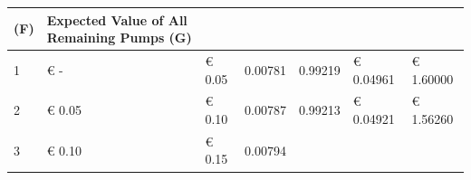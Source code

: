 \documentclass[serif, twocolumn, authordate, meta]{jote-article}
\begin{document}
\begin{table}[ht]
\begin{tabular}{@{}lllllll@{}}
\begin{minipage}[b]{0.12\linewidth}
\textbf{(F)}\strut \end{minipage} & \begin{minipage}[b]{0.12\linewidth}\raggedright \textbf{Expected Value of All Remaining Pumps (G)}\strut \end{minipage}\tabularnewline \hline \begin{minipage}[t]{0.12\linewidth}\raggedright 1\strut \end{minipage} & \begin{minipage}[t]{0.12\linewidth}\raggedright € -\strut \end{minipage} & \begin{minipage}[t]{0.12\linewidth}\raggedright € 0.05\strut \end{minipage} & \begin{minipage}[t]{0.12\linewidth}\raggedright 0.00781\strut \end{minipage} & \begin{minipage}[t]{0.12\linewidth}\raggedright 0.99219\strut \end{minipage} & \begin{minipage}[t]{0.12\linewidth}\raggedright € 0.04961\strut \end{minipage} & \begin{minipage}[t]{0.12\linewidth}\raggedright € 1.60000\strut \end{minipage}\tabularnewline \begin{minipage}[t]{0.12\linewidth}\raggedright 2\strut \end{minipage} & \begin{minipage}[t]{0.12\linewidth}\raggedright € 0.05\strut \end{minipage} & \begin{minipage}[t]{0.12\linewidth}\raggedright € 0.10\strut \end{minipage} & \begin{minipage}[t]{0.12\linewidth}\raggedright 0.00787\strut \end{minipage} & \begin{minipage}[t]{0.12\linewidth}\raggedright 0.99213\strut \end{minipage} & \begin{minipage}[t]{0.12\linewidth}\raggedright € 0.04921\strut \end{minipage} & \begin{minipage}[t]{0.12\linewidth}\raggedright € 1.56260\strut \end{minipage}\tabularnewline \begin{minipage}[t]{0.12\linewidth}\raggedright 3\strut \end{minipage} & \begin{minipage}[t]{0.12\linewidth}\raggedright € 0.10\strut \end{minipage} & \begin{minipage}[t]{0.12\linewidth}\raggedright € 0.15\strut \end{minipage} & \begin{minipage}[t]{0.12\linewidth}\raggedright 0.00794\strut \end{minipage} & 
\end{minipage}
\end{tabular}
\end{table}
\end{document}
